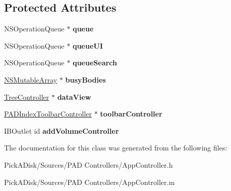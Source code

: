 \subsection*{Protected Attributes}
\begin{DoxyCompactItemize}
\item 
\hypertarget{interface_app_controller_ae9bc0ed5767fdc859b35643fb7a6d4f2}{
NSOperationQueue $\ast$ {\bfseries queue}}
\label{interface_app_controller_ae9bc0ed5767fdc859b35643fb7a6d4f2}

\item 
\hypertarget{interface_app_controller_ade563ce1f7b6a26a5585a32f29a70edf}{
NSOperationQueue $\ast$ {\bfseries queueUI}}
\label{interface_app_controller_ade563ce1f7b6a26a5585a32f29a70edf}

\item 
\hypertarget{interface_app_controller_a86a4b07187ff79a58d0562cef46fd0cb}{
NSOperationQueue $\ast$ {\bfseries queueSearch}}
\label{interface_app_controller_a86a4b07187ff79a58d0562cef46fd0cb}

\item 
\hypertarget{interface_app_controller_ac67eb5cefa1b285f59e4be3408516f92}{
\hyperlink{class_n_s_mutable_array}{NSMutableArray} $\ast$ {\bfseries busyBodies}}
\label{interface_app_controller_ac67eb5cefa1b285f59e4be3408516f92}

\item 
\hypertarget{interface_app_controller_a93184d9822b213027e343a617c8b2ca7}{
\hyperlink{interface_tree_controller}{TreeController} $\ast$ {\bfseries dataView}}
\label{interface_app_controller_a93184d9822b213027e343a617c8b2ca7}

\item 
\hypertarget{interface_app_controller_a3223e12d1314adbf3a1e156d3b1c6b24}{
\hyperlink{interface_p_a_d_index_toolbar_controller}{PADIndexToolbarController} $\ast$ {\bfseries toolbarController}}
\label{interface_app_controller_a3223e12d1314adbf3a1e156d3b1c6b24}

\item 
\hypertarget{interface_app_controller_af5f6fa294941f68e3fdcb912230c5e37}{
IBOutlet id {\bfseries addVolumeController}}
\label{interface_app_controller_af5f6fa294941f68e3fdcb912230c5e37}

\end{DoxyCompactItemize}


The documentation for this class was generated from the following files:\begin{DoxyCompactItemize}
\item 
PickADisk/Sources/PAD Controllers/AppController.h\item 
PickADisk/Sources/PAD Controllers/AppController.m\end{DoxyCompactItemize}
